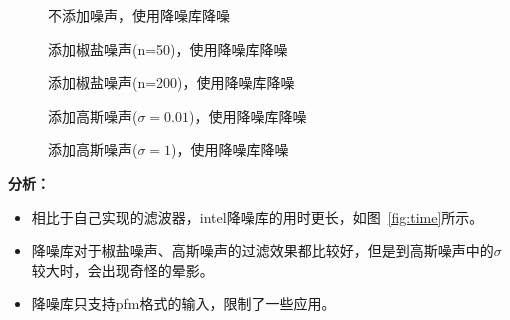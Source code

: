 \documentclass[lang=cn,10pt]{elegantbook}
\begin{document}
\begin{figure}[htbp]
	\centering
	\caption{不添加噪声，使用降噪库降噪}
	\label{fig:oid_cmp1}
\end{figure}

\begin{figure}[htbp]
	\centering
	\caption{添加椒盐噪声(n=50)，使用降噪库降噪}
	\label{fig:oid_cmp2.1}
\end{figure}

\begin{figure}[htbp]
	\centering
	\caption{添加椒盐噪声(n=200)，使用降噪库降噪}
	\label{fig:oid_cmp2.2}
\end{figure}

\begin{figure}[htbp]
	\centering
	\caption{添加高斯噪声($\sigma=0.01$)，使用降噪库降噪}
	\label{fig:oid_cmp3.1}
\end{figure}

\begin{figure}[htbp]
	\centering
	\caption{添加高斯噪声($\sigma=1$)，使用降噪库降噪}
	\label{fig:oid_cmp3.2}
\end{figure}

\vspace{50pt}
\quad \textcolor{second}{\textbf{分析：}}
\begin{itemize}
\item 相比于自己实现的滤波器，intel降噪库的用时更长，如图~\ref{fig:time}所示。

\item 降噪库对于椒盐噪声、高斯噪声的过滤效果都比较好，但是到高斯噪声中的$\sigma$较大时，会出现奇怪的晕影。

\item 降噪库只支持pfm格式的输入，限制了一些应用。

\end{itemize}
\end{document}
